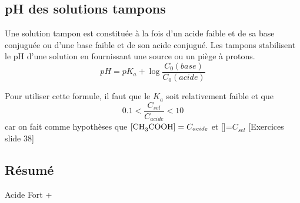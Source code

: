 \documentclass[11pt,a4paper,french]{article}
\begin{document}
\subsection{pH des solutions tampons}
Une solution tampon est constituée à la fois d'un acide faible et de sa base conjuguée ou d'une base faible et de son acide conjugué.
Les tampons stabilisent le pH d'une solution en fournissant une source ou un piège à protons.
$$pH = pK_a + \log{\frac{C_0(base)}{C_0(acide)}}$$

Pour utiliser cette formule, il faut que le $K_a$ soit relativement faible et que
$$0.1<\frac{C_{sel}}{C_{acide}}<10$$
car on fait comme hypothèses que $\ce{[CH3COOH]}=C_{acide}$ et []=$C_{sel}$
[Exercices slide 38]

\subsection{Résumé}
Acide Fort +
\end{document}
